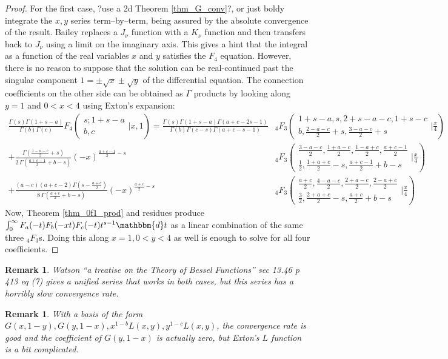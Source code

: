 \documentclass[12pt]{article}
\newcommand{\dd}[0] {\mathbbm{d}}
\numberwithin{equation}{section}
\newtheorem{remark}[theorem]{Remark}
\newcommand{\Head}[3] {{}_{#1}{#2}_{#3}}
\newcommand{\ArgS}[3] {( \begin{smallmatrix} #1 \\ #2 \end{smallmatrix} | {#3})}
\newcommand{\HypJ}[2] {F_{#1}(#2)}
\newcommand{\appellFfourS}[6]    {F_4 \ArgS{{#1};{#2}}{{#3},{#4}}{{#5},{#6}}}
\begin{document}
\begin{proof}
For the first case, ?use a 2d Theorem \ref{thm_G_conv}?, or just boldy integrate the $x,y$ series term--by--term, being assured by the absolute convergence of the result. Bailey replaces a $J_{\nu}$ function with a $K_{\nu}$ function and then transfers back to $J_{\nu}$ using a limit on the imaginary axis. This gives a hint that the integral as a function of the real variables $x$ and $y$ satisfies the $F_4$ equation. However, there is no reason to suppose that the solution can be real-continued past the singular component $1= \pm \sqrt{x} \pm \sqrt{y}$ of the differential equation. The connection coefficients on the other side can be obtained as $\Gamma$ products by looking along $y=1$ and $0<x<4$ using Exton's expansion:
\begin{equation}
\label{equ_appelF4_one}
\begin{aligned}
\tfrac{\Gamma (s) \Gamma (1+s-a)}{\Gamma (b) \Gamma (c)} \appellFfourS{s}{1+s-a}{b}{c}{x}{1} = \tfrac{\Gamma (s) \Gamma (1+s-a) \Gamma (a+c-2 s-1)}{\Gamma (b) \Gamma (c-s) \Gamma (a+c-s-1)} & \Head{4}{F}{3} \ArgS{1+s-a,s,2+s-a-c,1+s-c}{b,\frac{2-a-c}{2}+s,\frac{3-a-c}{2}+s}{\tfrac{x}{4}}\\
+ \tfrac{\Gamma(\frac{1-a-c}{2}+s)}{2 \, \Gamma(\frac{a+c-1}{2}+b-s)} (-x)^{\frac{a+c-1}{2}-s} & \Head{4}{F}{3} \ArgS{\frac{3-a-c}{2},\frac{1+a-c}{2},\frac{1-a+c}{2},\frac{a+c-1}{2}}{\frac{1}{2},\frac{1+a+c}{2}-s,\frac{a+c-1}{2}+b-s}{\tfrac{x}{4}}\\
+ \tfrac{(a-c) (a+c-2) \Gamma (s-\frac{a+c}{2})}{8 \, \Gamma (\frac{a+c}{2}+b-s)} (-x)^{\frac{a+c}{2}-s} & \Head{4}{F}{3} \ArgS{\frac{a+c}{2},\frac{4-a-c}{2},\frac{2+a-c}{2},\frac{2-a+c}{2}}{\frac{3}{2},\frac{2+a+c}{2}-s,\frac{a+c}{2}+b-s}{\tfrac{x}{4}}
\end{aligned}
\end{equation}
Now, Theorem \ref{thm_0f1_prod} and residues produce $\int_{0}^{\infty} \HypJ{a}{-t} \HypJ{b}{-x t} \HypJ{c}{-t} t^{s-1} \dd t$ as a linear combination of the same three $\Head{4}{F}{3}$s. Doing this along $x=1, 0<y<4$ as well is enough to solve for all four coefficients.
\end{proof}
\begin{remark}
Watson ``a treatise on the Theory of Bessel Functions'' sec 13.46 p 413 eq (7) gives a unified series that works in both cases, but this series has a horribly slow convergence rate.
\end{remark}
\begin{remark}
With a basis of the form $G(x,1-y), G(y,1-x), x^{1-b} L(x,y), y^{1-c} L(x,y)$, the convergence rate is good and the coefficient of $G(y,1-x)$ is actually zero, but Exton's $L$ function is a bit complicated.
\end{remark}
\end{document}
